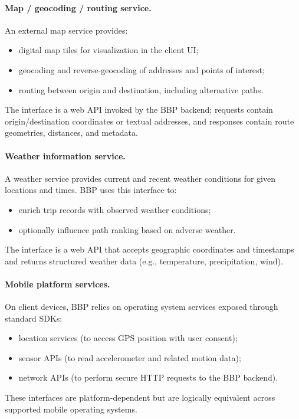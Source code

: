 \paragraph{Map / geocoding / routing service.}
An external map service provides:
\begin{itemize}[noitemsep,topsep=0.4em]
  \item digital map tiles for visualization in the client UI;\
  \item geocoding and reverse-geocoding of addresses and points of interest;
  \item routing between origin and destination, including alternative paths.
\end{itemize}
The interface is a web API invoked by the BBP backend; requests contain origin/destination coordinates or textual addresses, and responses contain route geometries, distances, and metadata.

\paragraph{Weather information service.}
A weather service provides current and recent weather conditions for given locations and times. BBP uses this interface to:
\begin{itemize}[noitemsep,topsep=0.4em]
  \item enrich trip records with observed weather conditions;
  \item optionally influence path ranking based on adverse weather.
\end{itemize}
The interface is a web API that accepts geographic coordinates and timestamps and returns structured weather data (e.g., temperature, precipitation, wind).

\paragraph{Mobile platform services.}
On client devices, BBP relies on operating system services exposed through standard SDKs:
\begin{itemize}[noitemsep,topsep=0.4em]
  \item location services (to access GPS position with user consent);
  \item sensor APIs (to read accelerometer and related motion data);
  \item network APIs (to perform secure HTTP requests to the BBP backend).
\end{itemize}
These interfaces are platform-dependent but are logically equivalent across supported mobile operating systems.

